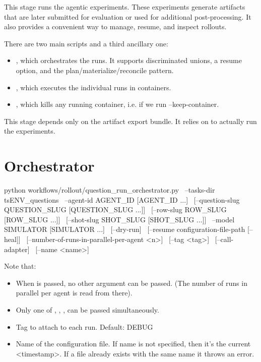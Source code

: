 \documentclass[11pt]{article}
\begin{document}
\label{docstart:agentic_rollout}

This stage runs the agentic experiments. 
These experiments generate artifacts that are later submitted for evaluation or used for additional post-processing. 
It also provides a convenient way to manage, resume, and inspect rollouts.

There are two main scripts and a third ancillary one:
\begin{itemize}
  \item {}, which orchestrates the runs. It supports discriminated unions, a resume option, and the plan/materialize/reconcile pattern.
  \item {}, which executes the individual runs in containers.
  \item {}, which kills any running container, i.e. if we run --keep-container.
\end{itemize}

This stage depends only on the artifact  export bundle. It relies on  to actually run the experiments.

\section*{Orchestrator}
\begin{DocCode}
python workflows/rollout/question_run_orchestrator.py \
  --tasks-dir tsENV_questions \
  --agent-id AGENT_ID [AGENT_ID ...] \
  [--question-slug QUESTION_SLUG [QUESTION_SLUG ...]] \
  [--row-slug ROW_SLUG [ROW_SLUG ...]] \
  [--shot-slug SHOT_SLUG [SHOT_SLUG ...]] \
  --model SIMULATOR [SIMULATOR ...] \
  [--dry-run] \
  [--resume configuration-file-path [--heal]] \
  [--number-of-runs-in-parallel-per-agent <n>] \
  [--tag <tag>] \ 
  [--call-adapter] \
  [--name <name>]
\end{DocCode}
Note that:
\begin{itemize}
  \item When \code{--resume} is passed, no other argument can be passed. (The number of runs in parallel per agent is read from there).
  \item Only one of \code{--question-slug}, ,  ,  can be passed simultaneously.
  \item \code{--tag} Tag to attach to each run. Default: DEBUG
  \item {} Name of the configuration file. If name is not specified, then it's the current <timestamp>. If a file already exists with the same name it throws an error.
\end{itemize}
\end{document}
